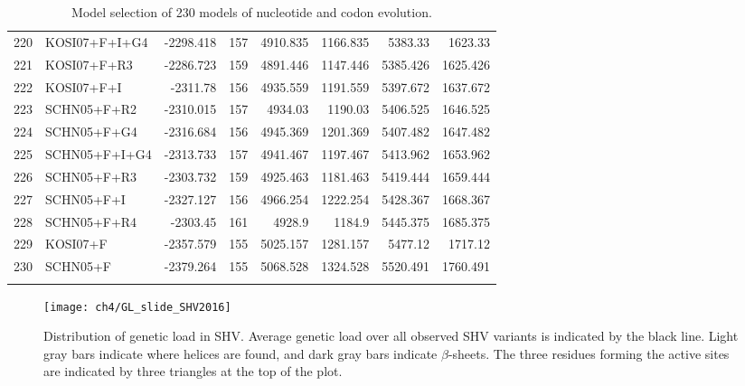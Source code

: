\begin{longtable}{clrrrrrr}
	220 & KOSI07+F+I+G4 & -2298.418 & 157 & 4910.835 & 1166.835 & 5383.33 & 1623.33 \\ 
	221 & KOSI07+F+R3 & -2286.723 & 159 & 4891.446 & 1147.446 & 5385.426 & 1625.426 \\ 
	222 & KOSI07+F+I & -2311.78 & 156 & 4935.559 & 1191.559 & 5397.672 & 1637.672 \\ 
	223 & SCHN05+F+R2 & -2310.015 & 157 & 4934.03 & 1190.03 & 5406.525 & 1646.525 \\ 
	224 & SCHN05+F+G4 & -2316.684 & 156 & 4945.369 & 1201.369 & 5407.482 & 1647.482 \\ 
	225 & SCHN05+F+I+G4 & -2313.733 & 157 & 4941.467 & 1197.467 & 5413.962 & 1653.962 \\ 
	226 & SCHN05+F+R3 & -2303.732 & 159 & 4925.463 & 1181.463 & 5419.444 & 1659.444 \\ 
	227 & SCHN05+F+I & -2327.127 & 156 & 4966.254 & 1222.254 & 5428.367 & 1668.367 \\ 
	228 & SCHN05+F+R4 & -2303.45 & 161 & 4928.9 & 1184.9 & 5445.375 & 1685.375 \\ 
	229 & KOSI07+F & -2357.579 & 155 & 5025.157 & 1281.157 & 5477.12 & 1717.12 \\ 
	230 & SCHN05+F & -2379.264 & 155 & 5068.528 & 1324.528 & 5520.491 & 1760.491 \\ 
  \caption{Model selection of 230 models of nucleotide and codon evolution.}
  \label{tab:AIC_full}
\end{longtable}




\begin{figure}[H]
     \centering
	\texttt{[image: ch4/GL\_slide\_SHV2016]}
	\caption{Distribution of genetic load in SHV. 
	Average genetic load over all observed SHV variants is indicated by the black line. 
	Light gray bars indicate where helices are found, and dark gray bars indicate $\beta$-sheets.
	The three residues forming the active sites are indicated by three triangles at the top of the plot.}
	\label{fig:shv2016_sse}
\end{figure}

